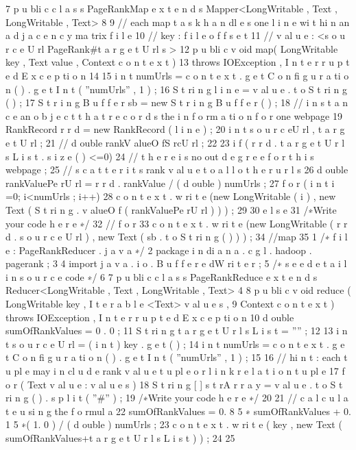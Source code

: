 7 p u bli c c l a s s PageRankMap e x t e n d s Mapper<LongWritable , Text , LongWritable , Text> {
8
9 // each map t a s k h a n dl e s one l i n e wi t hi n an a d j a c e n c y ma trix f i l e
10 // key : f i l e o f f s e t
11 // v al u e : <s o u r c e U rl PageRank#t a r g e t U rl s >
12 p u bli c v oid map( LongWritable key , Text value , Context c o n t e x t )
13 throws IOException , I n t e r r u p t e d E x c e p ti o n {
14
15 i n t numUrls = c o n t e x t . g e t C o n fi g u r a ti o n ( ) . g e t I n t ( ”numUrls” , 1 ) ;
16 S t ri n g l i n e = v al u e . t o S t ri n g ( ) ;
17 S t r i n g B u f f e r sb = new S t r i n g B u f f e r ( ) ;
18 // i n s t a n c e an o b j e c t t h a t r e c o r d s the i n f o rm a ti o n f o r one webpage
19 RankRecord r r d = new RankRecord ( l i n e ) ;
20 i n t s o u r c eU rl , t a r g e t U rl ;
21 // d ouble rankV alueO fS rcU rl ;
22
23 i f ( r r d . t a r g e t U r l s L i s t . s i z e ( ) <=0){
24 // t h e r e i s no out d e g r e e f o r t h i s webpage ;
25 // s c a t t e r i t s rank v al u e t o a l l o t h e r u r l s
26 d ouble rankValuePe rU rl = r r d . rankValue / ( d ouble ) numUrls ;
27 f o r ( i n t i =0; i<numUrls ; i++){
28 c o n t e x t . w ri t e (new LongWritable ( i ) , new Text ( S t ri n g . v alueO f ( rankValuePe rU rl ) ) ) ;
29 }
30 } e l s e {
31 /∗Write your code h e r e ∗/
32 } // f o r
33 c o n t e x t . w ri t e (new LongWritable ( r r d . s o u r c e U rl ) , new Text ( sb . t o S t ri n g ( ) ) ) ;
34 }//map
35 }
1 /∗ f i l e : PageRankReducer . j a v a ∗/
2 package i n di a n a . c g l . hadoop . pagerank ;
3
4 import j a v a . i o . B u f f e r e dW ri t e r ;
5 /∗ s e e d e t a i l i n s o u r c e code ∗/
6
7 p u bli c c l a s s PageRankReduce e x t e n d s Reducer<LongWritable , Text , LongWritable , Text>{
4
8 p u bli c v oid reduce ( LongWritable key , I t e r a b l e <Text> v al u e s ,
9 Context c o n t e x t ) throws IOException , I n t e r r u p t e d E x c e p ti o n {
10 d ouble sumOfRankValues = 0 . 0 ;
11 S t ri n g t a r g e t U r l s L i s t = ”” ;
12
13 i n t s o u r c e U rl = ( i n t ) key . g e t ( ) ;
14 i n t numUrls = c o n t e x t . g e t C o n fi g u r a ti o n ( ) . g e t I n t ( ”numUrls” , 1 ) ;
15
16 // hi n t : each t u pl e may i n cl u d e rank v al u e t u pl e o r l i n k r e l a t i o n t u pl e
17 f o r ( Text v al u e : v al u e s ) {
18 S t ri n g [ ] s t rA r r a y = v al u e . t o S t ri n g ( ) . s p l i t ( ”#” ) ;
19 /∗Write your code h e r e ∗/
20 }
21 // c a l c u l a t e u si n g the f o rmul a
22 sumOfRankValues = 0. 8 5 ∗ sumOfRankValues + 0. 1 5 ∗( 1. 0 ) / ( d ouble ) numUrls ;
23 c o n t e x t . w ri t e ( key , new Text ( sumOfRankValues+t a r g e t U r l s L i s t ) ) ;
24 }
25 }
